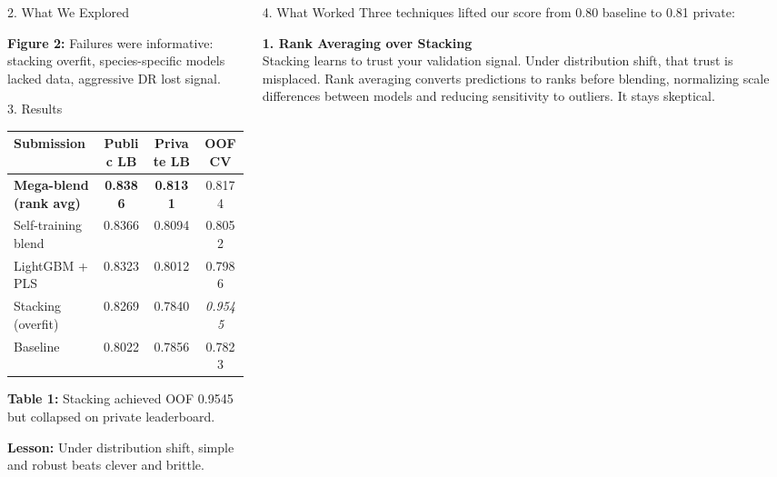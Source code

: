 \documentclass[final]{beamer}
\begin{document}
\begin{frame}[t]
\begin{columns}[t,totalwidth=\textwidth]
\begin{column}{0.48\textwidth}
\begin{block}{2. What We Explored}
\vspace{0.5em}
\begin{center}
{\normalsize\textbf{Figure 2:} Failures were informative: stacking overfit, species-specific models lacked data, aggressive DR lost signal.}
\end{center}
\end{block}

\vfill

\begin{block}{3. Results}
\vspace{0.3em}
\begin{center}
{\setlength{\tabcolsep}{1.2em}
\begin{tabular}{lccc}
\toprule
\textbf{Submission} & \textbf{Public LB} & \textbf{Private LB} & \textbf{OOF CV} \\
\midrule
\rowcolor{DarkBlue!10} \textbf{Mega-blend (rank avg)} & \textbf{0.8386} & \textbf{0.8131} & 0.8174 \\
Self-training blend & 0.8366 & 0.8094 & 0.8052 \\
LightGBM + PLS & 0.8323 & 0.8012 & 0.7986 \\
\rowcolor{Accent!10} Stacking (overfit) & 0.8269 & 0.7840 & \textit{0.9545} \\
Baseline & 0.8022 & 0.7856 & 0.7823 \\
\bottomrule
\end{tabular}}
\end{center}

\vspace{0.5em}
\begin{center}
{\normalsize\textbf{Table 1:} Stacking achieved OOF 0.9545 but collapsed on private leaderboard.}
\end{center}

\vspace{0.5em}
\textbf{Lesson:} Under distribution shift, simple and robust beats clever and brittle.
\end{block}

\end{column}

\begin{column}{0.48\textwidth}

\begin{block}{4. What Worked}
Three techniques lifted our score from 0.80 baseline to 0.81 private:

\vspace{0.6em}
\textbf{1. Rank Averaging over Stacking}\\[0.3em]
Stacking learns to trust your validation signal. Under distribution shift, that trust is misplaced. Rank averaging converts predictions to ranks before blending, normalizing scale differences between models and reducing sensitivity to outliers. It stays skeptical.


\end{block}
\end{column}
\end{columns}
\end{frame}
\end{document}
